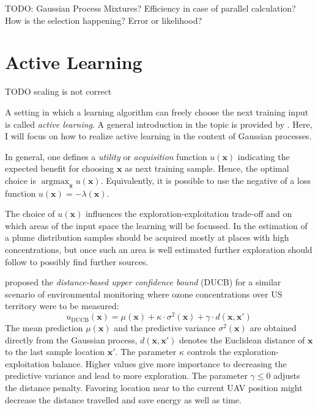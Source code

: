 \documentclass[11pt,a4paper,twoside,BCOR=15mm]{scrreprt}
\newcommand{\vc}[1]{\bm{#1}}
\DeclareMathOperator*{\argmax}{argmax}
\newcommand{\ped}[1]{_{\mathrm{#1}}}
\newcommand{\newterm}[1]{\emph{#1}}
\begin{document}
TODO\@: Gaussian Process Mixtures? Efficiency in case of parallel calculation?
How is the selection happening? Error or likelihood?

\section{Active Learning}
TODO scaling is not correct

A setting in which a learning algorithm can freely choose the next training 
input is called \newterm{active learning}. A general introduction in the topic 
is provided by \textcite{Settles:2009vo}. Here, I will focus on how to realize 
active learning in the context of Gaussian processes.

In general, one defines a \newterm{utility} or \newterm{acquisition} function 
$u(\vc x)$ indicating the expected benefit for choosing $\vc x$ as next training 
sample. Hence, the optimal choice is $\argmax_{\vc x} u(\vc x)$. Equivalently, 
it is possible to use the negative of a loss function $u(\vc x) = - \lambda(\vc 
x)$.

The choice of $u(\vc x)$ influences the exploration-exploitation trade-off and 
on which areas of the input space the learning will be focussed. In the 
estimation of a plume distribution samples should be acquired mostly at places 
with high concentrations, but once such an area is well estimated further 
exploration should follow to possibly find further sources.

\Textcite{Marchant:2012wb} proposed the \newterm{distance-based upper confidence 
    bound} (DUCB) for a similar scenario of environmental monitoring where ozone 
concentrations over US territory were to be measured:
\begin{equation}
    u\ped{DUCB}(\vc x) = \mu(\vc x) + \kappa \cdot \sigma^2(\vc x) + \gamma 
    \cdot d(\vc x, \vc x')
\end{equation}
The mean prediction $\mu(\vc x)$ and the predictive variance $\sigma^2(\vc x)$ 
are obtained directly from the Gaussian process, $d(\vc x, \vc x')$ denotes the 
Euclidean distance of $\vc x$ to the last sample location $\vc x'$. The 
parameter $\kappa$ controls the exploration-exploitation balance. Higher values 
give more importance to decreasing the predictive variance and lead to more 
exploration. The parameter $\gamma \leq 0$ adjusts the distance penalty.  
Favoring location near to the current UAV position might decrease the distance 
travelled and save energy as well as time.
\end{document}
